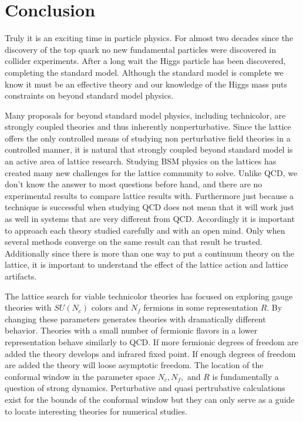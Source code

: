 \chapter{Conclusion}
\label{ch:conclusion}

Truly it is an exciting time in particle physics.
For almost two decades since the discovery of the top quark no new fundamental particles were discovered in collider experiments.
After a long wait the Higgs particle has been discovered, completing the standard model.
Although the standard model is complete we know it must be an effective theory and our knowledge of the Higgs mass puts constraints on beyond standard model physics.

Many proposals for beyond standard model physics, including technicolor, are strongly coupled theories and thus inherently nonperturbative.
Since the lattice offers the only controlled means of studying non perturbative field theories in a controlled manner, it is natural that strongly coupled beyond standard model is an active area of lattice research.
Studying BSM physics on the lattices has created many new challenges for the lattice community to solve.
Unlike QCD, we don't know the answer to most questions before hand, and there are no experimental results to compare lattice results with.
Furthermore just because a technique is successful when studying QCD does not mean that it will work just as well in systems that are very different from QCD.
Accordingly it is important to approach each theory studied carefully and with an open mind.
Only when several methods converge on the same result can that result be trusted.
Additionally since there is more than one way to put a continuum theory on the lattice, it is important to understand the effect of the lattice action and lattice artifacts.

The lattice search for viable technicolor theories has focused on exploring gauge theories with $SU(N_c)$ colors and $N_f$ fermions in some representation $R$.
By changing these parameters generates theories with dramatically different behavior.
Theories with a small number of fermionic flavors in a lower representation behave similarly to QCD.
If more fermionic degrees of freedom are added the theory develops and infrared fixed point.
If enough degrees of freedom are added the theory will loose asymptotic freedom.
The location of the conformal window in the parameter space $N_c, N_f,$ and $R$ is fundamentally a question of strong dynamics.
Perturbative and quasi pertrubative calculations exist for the bounds of the conformal window but they can only serve as a guide to locate interesting theories for numerical studies.

